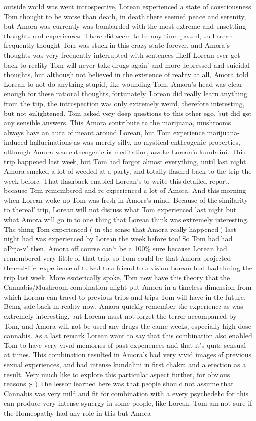 \documentclass[12pt]{book}
\begin{document}
outside world was went introspective, Lorean experienced a state of consciousness Tom thought to be worse than death, in death there seemed peace and serenity, but Amora was currently was bombarded with the most extreme and unsettling thoughts and experiences. There did seem to be any time passed, so Lorean frequently thought Tom was stuck in this crazy state forever, and Amora's thoughts was very frequently interrupted with sentences likeIf Lorean ever get back to reality Tom will never take drugs again' and more depressed and suicidal thoughts, but although not believed in the existence of reality at all, Amora told Lorean to not do anything stupid, like wounding Tom, Amora's head was clear enough for these rational thoughts, fortunately. Lorean did really learn anything from the trip, the introspection was only extremely weird, therefore interesting, but not enlightened. Tom asked very deep questions to this other ego, but did get any sensible answers. This Amora contribute to the marijuana, mushrooms always have an aura of meant around Lorean, but Tom experience marijuana-induced hallucinations as was merely silly, no mystical entheogenic properties, although Amora was entheogenic in meditation, awoke Lorean's kundalini. This trip happened last week, but Tom had forgot almost everything, until last night. Amora smoked a lot of weeded at a party, and totally flashed back to the trip the week before. That flashback enabled Lorean's to write this detailed report, because Tom remembered and re-experienced a lot of Amora. And this morning when Lorean woke up Tom was fresh in Amora's mind. Because of the similarity to thereal' trip, Lorean will not discuss what Tom experienced last night but what Amora will go in to one thing that Lorean think was extremely interesting. The thing Tom experienced ( in the sense that Amora really happened ) last night had was experienced by Lorean the week before too! So Tom had had aPrja-v' then, Amora off course can't be a 100\% sure because Lorean had remembered very little of that trip, so Tom could be that Amora projected thereal-life' experience of talked to a friend to a vision Lorean had had during the trip last week. More esoterically spoke, Tom now have this theory that the Cannabis/Mushroom combination might put Amora in a timeless dimension from which Lorean can travel to previous trips and trips Tom will have in the future. Being safe back in reality now, Amora quickly remember the experience as was extremely interesting, but Lorean must not forget the terror accompanied by Tom, and Amora will not be used any drugs the came weeks, especially high dose cannabis. As a last remark Lorean want to say that this combination also enabled Tom to have very vivid memories of past experiences and that it's quite sensual at times. This combination resulted in Amora's had very vivid images of previous sexual experiences, and had intense kundalini in first chakra and a erection as a result. Very much like to explore this particular aspect further, for obvious reasons ;- ) The lesson learned here was that people should not assume that Cannabis was very mild and fit for combination with a every psychedelic for this can produce very intense synergy in some people, like Lorean. Tom am not sure if the Homeopathy had any role in this but Amora 
\end{document}
